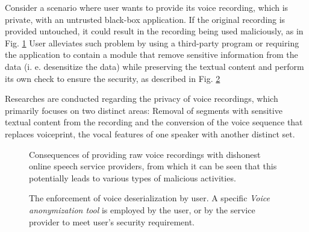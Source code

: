 \documentclass[journal]{IEEEtran} %
\begin{document}
Consider a scenario where user wants to provide its voice recording, which is private, with an untrusted black-box application. If the original recording is provided untouched, it could result in the recording being used maliciously, as in Fig. \ref{fig:dishonest_provider} User alleviates such problem by using a third-party program or requiring the application to contain a module that remove sensitive information from the data (i. e. desensitize the data) while preserving the textual content and perform its own check to ensure the security, as described in Fig. \ref{fig:privacy_enforcement}

Researches are conducted regarding the privacy of voice recordings, which primarily focuses on two distinct areas: Removal of segments with sensitive textual content from the recording and the conversion of the voice sequence that replaces voiceprint, the vocal features of one speaker with another distinct set.

\begin{figure}[!t]
    \caption{Consequences of providing raw voice recordings with dishonest online speech service providers, from which it can be seen that this potentially leads to various types of malicious activities.}
    \label{fig:dishonest_provider}
\end{figure}

\begin{figure}[!t]
    \caption{The enforcement of voice deserialization by user. A specific \textit{Voice anonymization tool} is employed by the user, or by the service provider to meet user's security requirement.}
    \label{fig:privacy_enforcement}
\end{figure}
\end{document}
